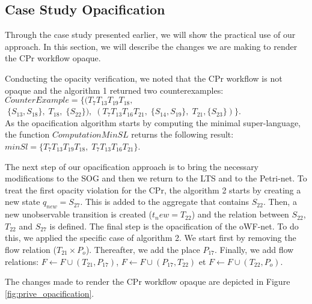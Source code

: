 \subsection{Case Study Opacification}
Through the case study presented earlier, we will show the practical use of our approach. In this section, we will describe the changes we are making to render the CPr workflow opaque.

Conducting the opacity verification, we noted that the CPr workflow is not opaque and the algorithm 1 returned two counterexamples: 
$CounterExample=\{
(T_7T_{13}T_{19}T_{18},$\\$ \; \{S_{13},S_{18}\}, \; T_{18}, \; \{S_{22}\}), \;
(T_7T_{13}T_{16}T_{21}, \; \{S_{14},S_{19}\}, \; T_{21}, \{S_{23}\}) \}$. \\
As the opacification algorithm starts by computing the minimal super-language, the function $ComputationMinSL$ returns the following result: \\ $minSl=\{T_7T_{13}T_{19}T_{18},\; T_7T_{13}T_{16}T_{21}\}$.

The next step of our opacification approach is to bring the necessary modifications to the SOG and then we return to the LTS and to the Petri-net. To treat the first opacity violation for the CPr, the algorithm 2 starts by creating a new state $q_{new}=S_{27}$. This is added to the aggregate that contains $S_{22}$. Then, a new unobservable transition is created ($t_new = T_ {22}$) and  the relation between $S_{22}$, $T_{22}$ and $S_{27}$ is defined. 
The final step is the opacification of the oWF-net. To do this, we applied the specific case of algorithm 2. We start first by removing the flow relation ($T_{21} × P_o$). Thereafter, we add the place $P_ {17}$. Finally, we add flow relations: $F \leftarrow F \cup (T_{21},P_{17})$, $F \leftarrow F \cup (P_{17},T_{22})$ et $F \leftarrow F \cup (T_{22},P_o)$.

The changes made to render the CPr workflow opaque are depicted in Figure \ref{fig:prive_opacification}.


